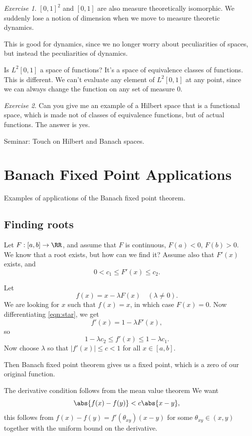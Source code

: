 \documentclass{article}
\theoremstyle{remark}
\newtheorem{exercise}{Exercise}
\begin{document}
\begin{exercise}
    $[0,1]^2$ and $[0,1]$ are also measure theoretically
    isomorphic. We suddenly lose a notion of dimension when
    we move to measure theoretic dynamics.
\end{exercise}

This is good for dynamics, since we no longer worry about 
peculiarities of spaces, but instead the peculiarities 
of dynamics.

Is $L^2[0,1]$ a space of functions? It's a space of equivalence
classes of functions. This is different. We can't evaluate any 
element of $L^2[0,1]$ at any point, since we can always change
the function on any set of measure $0$.

\begin{exercise}
Can you give me an example of a Hilbert space that is a 
functional space, which is made
not of classes of equivalence functions, but of actual functions.
The answer is yes.
\end{exercise}

Seminar: Touch on Hilbert and Banach spaces.

\section{Banach Fixed Point Applications}

Examples of applications of the Banach fixed point theorem.

\subsection{Finding roots}

Let $F:[a,b]\to \RR$, and assume that $F$ is continuous,
$F(a) < 0$, $F(b) > 0$. We know that a root exists, but how 
can we find it? Assume also that $F'(x)$ exists, and 
\[ 0 < c_1 \le F'(x) \le c_2. \]

Let 
\[ f(x) = x-\lambda F(x)\quad  (\lambda\ne 0) \tag{*}\label{eqn:star}. \]
We are looking for $x$ such that
$f(x) = x$, in which case $F(x)=0$. Now differentiating
\eqref{eqn:star}, we get
\[ f'(x) = 1- \lambda F'(x),\]
so 
\[ 1-\lambda c_2 \le f'(x) \le 1 -\lambda c_1. \]
Now choose $\lambda$ so that $|f'(x)| \le c < 1$
for all $x\in [a,b]$.

Then Banach fixed point theorem gives us a fixed point, which
is a zero of our original function.

The derivative condition follows from the mean value theorem
We want \[\abs{f(x)-f(y)} < c\abs{x-y},\]
this follows from $f(x)-f(y) = f'(\theta_{xy}) (x-y)$ for 
some $\theta_{xy} \in (x,y)$ together with the uniform
bound on the derivative.
\end{document}

